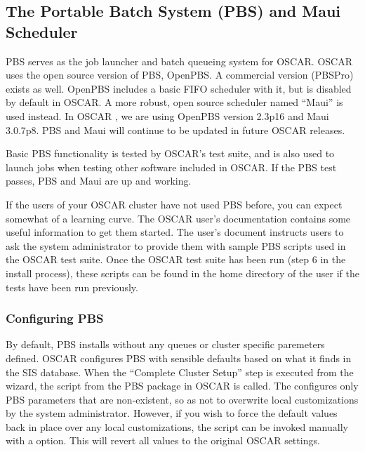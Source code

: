 %
%
%

\subsection{The Portable Batch System (PBS) and Maui Scheduler}
\label{app:pbs-overview}

PBS serves as the job launcher and batch queueing system for OSCAR.
OSCAR uses the open source version of PBS, OpenPBS.  A commercial
version (PBSPro) exists as well.  OpenPBS includes a basic FIFO
scheduler with it, but is disabled by default in OSCAR.  A more
robust, open source scheduler named ``Maui'' is used instead.  In
OSCAR \oscarversion, we are using OpenPBS version 2.3p16 and Maui
3.0.7p8.  PBS and Maui will continue to be updated in future OSCAR
releases.

Basic PBS functionality is tested by OSCAR's test suite, and is also
used to launch jobs when testing other software included in OSCAR.  If
the PBS test passes, PBS and Maui are up and working.  

If the users of your OSCAR cluster have not used PBS before, you can
expect somewhat of a learning curve.  The OSCAR user's documentation
contains some useful information to get them started.  The user's
document instructs users to ask the system administrator to provide
them with sample PBS scripts used in the OSCAR test suite.  Once the
OSCAR test suite has been run (step 6 in the install process), these
scripts can be found in the home directory of the  user
if the tests have been run previously.

\subsubsection{Configuring PBS}

By default, PBS installs without any queues or cluster specific
paremeters defined.  OSCAR configures PBS with sensible defaults based
on what it finds in the SIS database.  When the ``Complete Cluster
Setup'' step is executed from the wizard, the 
script from the PBS package in OSCAR is called.  The
 configures only PBS parameters that are
non-existent, so as not to overwrite local customizations by the
system administrator.  However, if you wish to force the default
values back in place over any local customizations, the
 script can be invoked manually with a
 option.  This will revert all values to the original
OSCAR settings.

